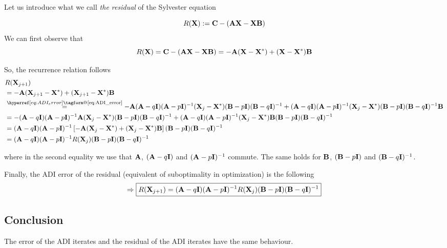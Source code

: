 \documentclass[10pt]{article}
\makeatletter
\renewcommand*{\eqref}[1]{%
  \hyperref[{#1}]{\textup{\tagform@{\ref*{#1}}}}%
}
\theoremstyle{definition}
\makeatother
\begin{document}
Let us introduce what we call \emph{the residual} of the Sylvester equation~\eqref{eq:Sylvester_eq}
\begin{equation}
    R({\bf X}) := {\bf C} - ({\bf A} {\bf X} - {\bf X} {\bf B})
\end{equation}
We can first observe that
\begin{equation*}
    R({\bf X}) = {\bf C} - ({\bf A} {\bf X} - {\bf X} {\bf B}) = - {\bf A} ({\bf X} - {\bf X}^*) + ({\bf X} - {\bf X}^*) {\bf B}
\end{equation*}

So, the recurrence relation follows
\begin{align*}
    &R(\mX_{j+1}) \\
    &= - \mA (\mX_{j+1} - \mX^*) + (\mX_{j+1} - \mX^*) \mB \\
    &\overset{\eqref{eq:ADI_error}}{=} - \mA (\mA - q \mI) (\mA - p \mI)^{-1} (\mX_{j} - \mX^*) (\mB - p \mI) (\mB - q \mI)^{-1} + (\mA - q \mI) (\mA - p \mI)^{-1} (\mX_{j} - \mX^*) (\mB - p \mI) (\mB - q \mI)^{-1} \mB \\
    &= - (\mA - q \mI) (\mA - p \mI)^{-1} \mA (\mX_{j} - \mX^*) (\mB - p \mI) (\mB - q \mI)^{-1} + (\mA - q \mI) (\mA - p \mI)^{-1} (\mX_{j} - \mX^*) \mB (\mB - p \mI) (\mB - q \mI)^{-1} \\
    &= (\mA - q \mI) (\mA - p \mI)^{-1} \left[- \mA (\mX_{j} - \mX^*) + (\mX_{j} - \mX^*) \mB \right] (\mB - p \mI) (\mB - q \mI)^{-1} \\
    &= (\mA - q \mI) (\mA - p \mI)^{-1} R(\mX_{j}) (\mB - p \mI) (\mB - q \mI)^{-1}
\end{align*}

where in the second equality we use that ${\bf A}$, $({\bf A} - q {\bf I})$ and $({\bf A} - p {\bf I})^{-1}$ commute. The same holds for ${\bf B}$, $({\bf B} - p {\bf I})$ and $({\bf B} - q {\bf I})^{-1}$.

Finally, the ADI error of the residual (equivalent of suboptimality in optimization) is the following
\begin{equation}
    \label{eq:ADI_residual_error}
    \Rightarrow \boxed{R({\bf X}_{j+1}) = ({\bf A} - q {\bf I}) ({\bf A} - p {\bf I})^{-1} R({\bf X}_{j}) ({\bf B} - p {\bf I}) ({\bf B} - q {\bf I})^{-1}}
\end{equation}

\subsection{Conclusion}

The error of the ADI iterates and the residual of the ADI iterates have the same behaviour.


{\printbibliography}
\end{document}
